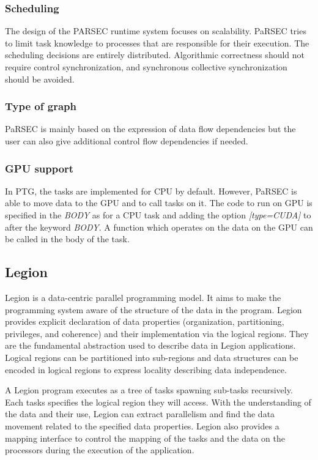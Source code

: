 \subsubsection{Scheduling}
The design of the PARSEC runtime system focuses on scalability.
PaRSEC tries to limit task knowledge to processes that are responsible for their execution.
The scheduling decisions are entirely distributed.
Algorithmic correctness should not require control synchronization, and synchronous collective synchronization should be avoided.


\subsubsection{Type of graph}
PaRSEC is mainly based on the expression of data flow dependencies but the user can also give additional control flow dependencies if needed.

\subsubsection{GPU support}
In PTG, the tasks are implemented for CPU by default.
However, PaRSEC is able to move data to the GPU and to call tasks on it.
The code to run on GPU is specified in the \textit{BODY} as for a CPU task and adding the option \textit{[type=CUDA]} to
after the keyword \textit{BODY}.
A function which operates on the data on the GPU can be called in the body of the task.


\subsection{Legion}
Legion \cite{BaTSA2012} is a data-centric parallel programming model.
It aims to make the programming system aware of the structure of the data in the program.
Legion provides explicit declaration of data properties (organization, partitioning, privileges, and coherence) and their implementation via the logical regions.
They are the fundamental abstraction used to describe data in Legion applications.
Logical regions can be partitioned into sub-regions and data structures can be encoded in logical regions to express locality describing data independence.

A Legion program executes as a tree of tasks spawning sub-tasks recursively.
Each tasks specifies the logical region they will access.
With the understanding of the data and their use, Legion can extract parallelism and find the data movement related to the specified data properties.
Legion also provides a mapping interface to control the mapping of the tasks and the data on the processors during the execution of the application.

